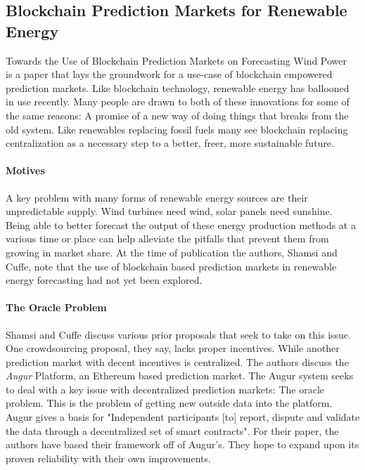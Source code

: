 \documentclass{article}
\begin{document}
    \subsection{Blockchain Prediction Markets for Renewable Energy}

    Towards the Use of Blockchain Prediction Markets on Forecasting Wind Power~\cite{windForcasting} is a paper that lays the
    groundwork for a use-case of blockchain empowered prediction markets. Like blockchain technology, renewable energy has
    ballooned in use recently. Many people are drawn to both of these innovations for some of the same reasons:
    A promise of a new way of doing things that breaks from the old system. Like renewables replacing fossil fuels many see
    blockchain replacing centralization as a necessary step to a better, freer, more sustainable future.

    \paragraph{Motives}
    A key problem with many forms of renewable energy sources are their unpredictable supply. Wind turbines need wind,
    solar panels need sunshine. Being able to better forecast the output of these energy production methods at a various
    time or place can help alleviate the pitfalls that prevent them from growing in market share.  At the time of publication
    the authors, Shamsi and Cuffe, note that the use of blockchain based prediction markets in renewable energy forecasting
    had not yet been explored.

    \paragraph{The Oracle Problem}
    Shamsi and Cuffe discuss various prior proposals that seek to take on this issue. One crowdsourcing proposal, they
    say, lacks proper incentives. While another prediction market with decent incentives is centralized.
    The authors discuss the \textit{Augur} Platform, an Ethereum based prediction market. The Augur system seeks to deal with a
    key issue with decentralized prediction markets: The oracle problem. This is the problem of getting new outside data
    into the platform. Augur gives a basis for "Independent participants [to] report, dispute and validate the data
    through a decentralized set of smart contracts".  For their paper, the authors have based their framework off
    of Augur's.  They hope to expand upon its proven reliability with their own improvements.
\end{document}
